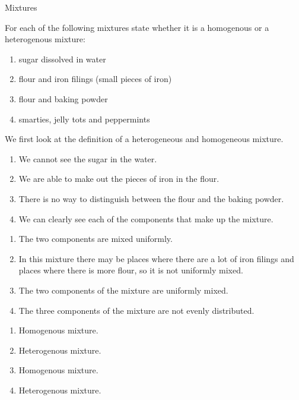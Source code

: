       \begin{wex}{Mixtures}
{For each of the following mixtures state whether it is a homogenous or a heterogenous mixture:
\label{m38708*eip-id1167649056231}\begin{enumerate}[noitemsep, label=\textbf{\alph*}. ] 
            \leftskip=20pt\rightskip=\leftskip\item sugar dissolved in water
\item flour and iron filings (small pieces of iron)
\item flour and baking powder
\item smarties, jelly tots and peppermints\end{enumerate} }
{
We first look at the definition of a heterogeneous and homogeneous mixture.
\begin{enumerate}[noitemsep, label=\textbf{\alph*}. ] 
\item We cannot see the sugar in the water.
\item We are able to make out the pieces of iron in the flour.
\item There is no way to distinguish between the flour and the baking powder.
\item We can clearly see each of the components that make up the mixture. \end{enumerate}
\begin{enumerate}[noitemsep, label=\textbf{\alph*}. ] 
\item The two components are mixed uniformly.
\item In this mixture there may be places where there are a lot of iron filings and places where there is more flour, so it is not uniformly mixed.
\item The two components of the mixture are uniformly mixed.
\item The three components of the mixture are not evenly distributed.\end{enumerate}
\begin{enumerate}[noitemsep, label=\textbf{\alph*}. ] 
\item Homogenous mixture.
\item Heterogenous mixture.
\item Homogenous mixture.
\item Heterogenous mixture.\end{enumerate}}
    \end{wex}
 
